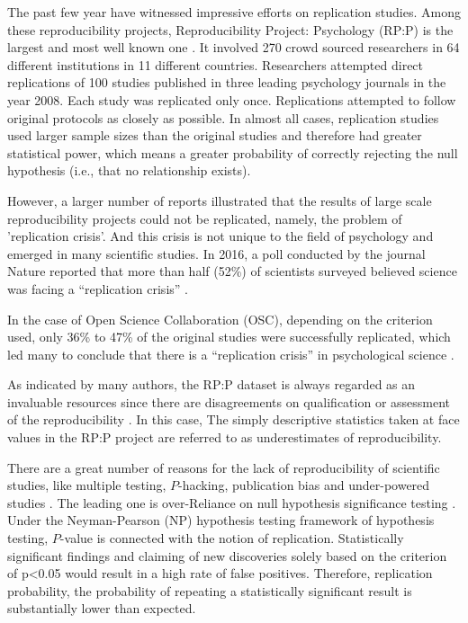 \documentclass[11pt,a4paper,twoside]{book}\usepackage[]{graphicx}\usepackage[]{color}
\begin{document}
The past few year have witnessed impressive efforts on replication studies. Among these reproducibility projects, Reproducibility Project: Psychology (RP:P) is the largest and most well known one \citep{open2015estimating}. It involved 270 crowd sourced researchers in 64 different institutions in 11 different countries. Researchers attempted direct replications of 100 studies published in three leading psychology journals in the year 2008. Each study was replicated only once. Replications attempted to follow original protocols as closely as possible. In almost all cases, replication studies used larger sample sizes than the original studies and therefore had greater statistical power, which means a greater probability of correctly rejecting the null hypothesis (i.e., that no relationship exists).


However, a larger number of reports illustrated that the results of large scale reproducibility projects could not be replicated, namely, the problem of 'replication crisis'. And this crisis is not unique to the field of psychology and emerged in many scientific studies. In 2016, a poll conducted by the journal Nature reported that more than half (52\%) of scientists surveyed believed science was facing a “replication crisis” \citep{baker20161}.

In the case of Open Science Collaboration (OSC), depending on the criterion used, only 36\% to 47\% of the original studies were successfully replicated, which led many to conclude that there is a “replication crisis” in psychological science \citep{carey2015psychology}. 

As indicated by many authors, the RP:P dataset is always regarded as an invaluable resources since there are disagreements on qualification or assessment of the reproducibility \citep{goodman2016does,amrhein2017earth}. In this case, The simply descriptive statistics taken at face values in the RP:P project are referred to as underestimates of reproducibility. 


There are a great number of reasons for the lack of reproducibility of scientific studies, like multiple testing, $P$-hacking, publication bias and under-powered studies \citep{benjamin2018redefine}. The leading one is over-Reliance on null hypothesis significance testing \citep{ioannidis2005most}. Under the Neyman-Pearson (NP) hypothesis testing framework of hypothesis testing, $P$-value is connected with the notion of replication. Statistically significant findings and claiming of new discoveries solely based on the criterion of p<0.05 would result in a high rate of false positives. Therefore, replication probability, the probability of repeating a statistically significant result is substantially lower than expected.
\end{document}
